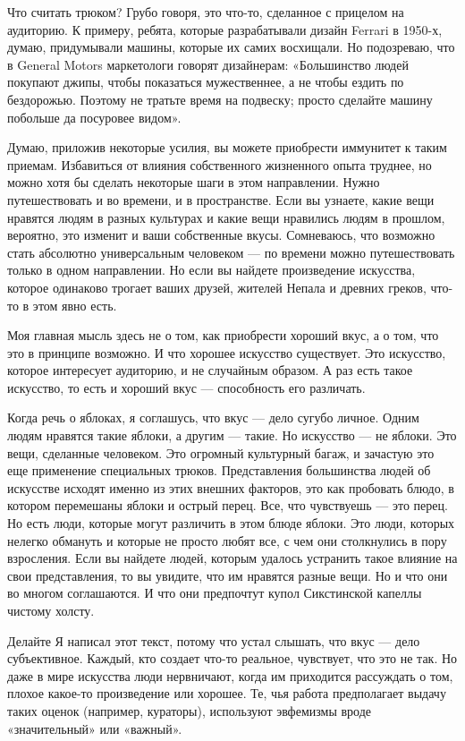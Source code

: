 \documentclass[ebook,12pt,oneside,openany]{memoir}
\begin{document}
Что считать трюком? Грубо говоря, это что-то, сделанное с прицелом на
аудиторию. К примеру, ребята, которые разрабатывали дизайн Ferrari в
1950-х, думаю, придумывали машины, которые их самих восхищали. Но
подозреваю, что в General Motors маркетологи говорят дизайнерам:
«Большинство людей покупают джипы, чтобы показаться мужественнее, а не
чтобы ездить по бездорожью. Поэтому не тратьте время на подвеску;
просто сделайте машину побольше да посуровее видом».

Думаю, приложив некоторые усилия, вы можете приобрести иммунитет к
таким приемам. Избавиться от влияния собственного жизненного опыта
труднее, но можно хотя бы сделать некоторые шаги в этом направлении.
Нужно путешествовать и во времени, и в пространстве. Если вы узнаете,
какие вещи нравятся людям в разных культурах и какие вещи нравились
людям в прошлом, вероятно, это изменит и ваши собственные вкусы.
Сомневаюсь, что возможно стать абсолютно универсальным человеком — по
времени можно путешествовать только в одном направлении. Но если вы
найдете произведение искусства, которое одинаково трогает ваших
друзей, жителей Непала и древних греков, что-то в этом явно есть.

Моя главная мысль здесь не о том, как приобрести хороший вкус, а о
том, что это в принципе возможно. И что хорошее искусство существует.
Это искусство, которое интересует аудиторию, и не случайным образом. А
раз есть такое искусство, то есть и хороший вкус — способность его
различать.

Когда речь о яблоках, я соглашусь, что вкус — дело сугубо личное.
Одним людям нравятся такие яблоки, а другим — такие. Но искусство — не
яблоки. Это вещи, сделанные человеком. Это огромный культурный багаж,
и зачастую это еще применение специальных трюков. Представления
большинства людей об искусстве исходят именно из этих внешних
факторов, это как пробовать блюдо, в котором перемешаны яблоки и
острый перец. Все, что чувствуешь — это перец. Но есть люди, которые
могут различить в этом блюде яблоки. Это люди, которых нелегко
обмануть и которые не просто любят все, с чем они столкнулись в пору
взросления. Если вы найдете людей, которым удалось устранить такое
влияние на свои представления, то вы увидите, что им нравятся разные
вещи. Но и что они во многом соглашаются. И что они предпочтут купол
Сикстинской капеллы чистому холсту.

Делайте Я написал этот текст, потому что устал слышать, что вкус —
дело субъективное. Каждый, кто создает что-то реальное, чувствует, что
это не так. Но даже в мире искусства люди нервничают, когда им
приходится рассуждать о том, плохое какое-то произведение или хорошее.
Те, чья работа предполагает выдачу таких оценок (например, кураторы),
используют эвфемизмы вроде «значительный» или «важный».
\end{document}
